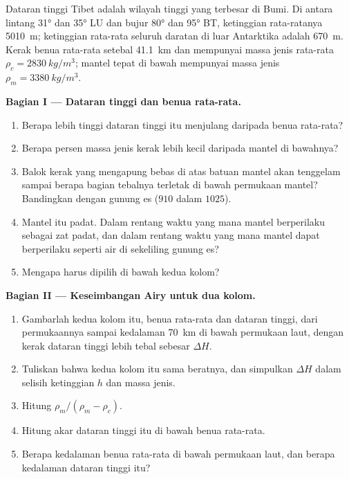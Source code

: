 \begin{problem}
\label{pb:g11:lithosphere-asthenosphere:1}
Dataran tinggi Tibet adalah wilayah tinggi yang terbesar di Bumi. Di antara
lintang \ang{31} dan \ang{35} LU dan bujur \ang{80} dan \ang{95} BT,
ketinggian rata-ratanya \qty{5010}{m}; ketinggian rata-rata seluruh daratan di
luar Antarktika adalah \qty{670}{m}. Kerak benua rata-rata setebal
\qty{41.1}{km} dan mempunyai massa jenis rata-rata $\rho_c = \qty{2830}{kg/m^3}$;
mantel tepat di bawah  mempunyai massa jenis $\rho_m = \qty{3380}{kg/m^3}$.

\medskip
\noindent\textbf{Bagian I --- Dataran tinggi dan benua rata-rata.}
\begin{enumerate}
  \item Berapa lebih tinggi dataran tinggi itu menjulang daripada benua rata-rata?
  \item Berapa persen massa jenis kerak lebih kecil daripada mantel di bawahnya?
  \item Balok kerak yang mengapung bebas di atas batuan mantel akan tenggelam
        sampai berapa bagian tebalnya terletak di bawah permukaan mantel?
        Bandingkan dengan gunung es ($910$ dalam $1025$).
  \item Mantel itu padat. Dalam rentang waktu yang mana mantel berperilaku
        sebagai zat padat, dan dalam rentang waktu yang mana mantel dapat
        berperilaku seperti air di sekeliling gunung es?
  \item Mengapa  harus dipilih di bawah  kedua
        kolom?
\end{enumerate}

\medskip
\noindent\textbf{Bagian II --- Keseimbangan Airy untuk dua kolom.}
\begin{enumerate}[resume]
  \item Gambarlah kedua kolom itu, benua rata-rata dan dataran tinggi, dari
        permukaannya sampai kedalaman \qty{70}{km} di bawah permukaan laut,
        dengan kerak dataran tinggi lebih tebal sebesar $\Delta H$.
  \item Tuliskan bahwa kedua kolom itu sama beratnya, dan simpulkan $\Delta H$
        dalam selisih ketinggian $h$ dan massa jenis.
  \item Hitung $\rho_m/(\rho_m - \rho_c)$.
  \item Hitung akar dataran tinggi itu di bawah  benua
        rata-rata.
  \item Berapa kedalaman  benua rata-rata di bawah permukaan laut, dan
        berapa kedalaman  dataran tinggi itu?
\end{enumerate}


\end{problem}
